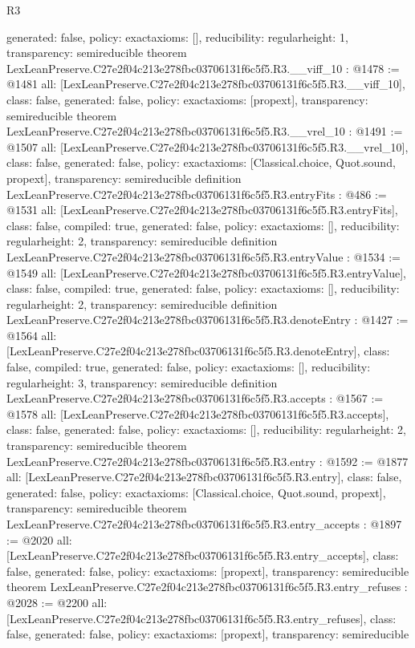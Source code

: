 \begin{lexlean}{R3}
\begin{coremodule}
{  generated: false,
  policy: exact{axioms: []},
  reducibility: regular{height: 1},
  transparency: semireducible
}
theorem LexLeanPreserve.C27e2f04c213e278fbc03706131f6c5f5.R3.__viff_10 : @1478 := @1481 {
  all: [LexLeanPreserve.C27e2f04c213e278fbc03706131f6c5f5.R3.__viff_10],
  class: false,
  generated: false,
  policy: exact{axioms: [propext]},
  transparency: semireducible
}
theorem LexLeanPreserve.C27e2f04c213e278fbc03706131f6c5f5.R3.__vrel_10 : @1491 := @1507 {
  all: [LexLeanPreserve.C27e2f04c213e278fbc03706131f6c5f5.R3.__vrel_10],
  class: false,
  generated: false,
  policy: exact{axioms: [Classical.choice, Quot.sound, propext]},
  transparency: semireducible
}
definition LexLeanPreserve.C27e2f04c213e278fbc03706131f6c5f5.R3.entryFits : @486 := @1531 {
  all: [LexLeanPreserve.C27e2f04c213e278fbc03706131f6c5f5.R3.entryFits],
  class: false,
  compiled: true,
  generated: false,
  policy: exact{axioms: []},
  reducibility: regular{height: 2},
  transparency: semireducible
}
definition LexLeanPreserve.C27e2f04c213e278fbc03706131f6c5f5.R3.entryValue : @1534 := @1549 {
  all: [LexLeanPreserve.C27e2f04c213e278fbc03706131f6c5f5.R3.entryValue],
  class: false,
  compiled: true,
  generated: false,
  policy: exact{axioms: []},
  reducibility: regular{height: 2},
  transparency: semireducible
}
definition LexLeanPreserve.C27e2f04c213e278fbc03706131f6c5f5.R3.denoteEntry : @1427 := @1564 {
  all: [LexLeanPreserve.C27e2f04c213e278fbc03706131f6c5f5.R3.denoteEntry],
  class: false,
  compiled: true,
  generated: false,
  policy: exact{axioms: []},
  reducibility: regular{height: 3},
  transparency: semireducible
}
definition LexLeanPreserve.C27e2f04c213e278fbc03706131f6c5f5.R3.accepts : @1567 := @1578 {
  all: [LexLeanPreserve.C27e2f04c213e278fbc03706131f6c5f5.R3.accepts],
  class: false,
  generated: false,
  policy: exact{axioms: []},
  reducibility: regular{height: 2},
  transparency: semireducible
}
theorem LexLeanPreserve.C27e2f04c213e278fbc03706131f6c5f5.R3.entry : @1592 := @1877 {
  all: [LexLeanPreserve.C27e2f04c213e278fbc03706131f6c5f5.R3.entry],
  class: false,
  generated: false,
  policy: exact{axioms: [Classical.choice, Quot.sound, propext]},
  transparency: semireducible
}
theorem LexLeanPreserve.C27e2f04c213e278fbc03706131f6c5f5.R3.entry_accepts : @1897 := @2020 {
  all: [LexLeanPreserve.C27e2f04c213e278fbc03706131f6c5f5.R3.entry_accepts],
  class: false,
  generated: false,
  policy: exact{axioms: [propext]},
  transparency: semireducible
}
theorem LexLeanPreserve.C27e2f04c213e278fbc03706131f6c5f5.R3.entry_refuses : @2028 := @2200 {
  all: [LexLeanPreserve.C27e2f04c213e278fbc03706131f6c5f5.R3.entry_refuses],
  class: false,
  generated: false,
  policy: exact{axioms: [propext]},
  transparency: semireducible
}


\end{coremodule}
\end{lexlean}
